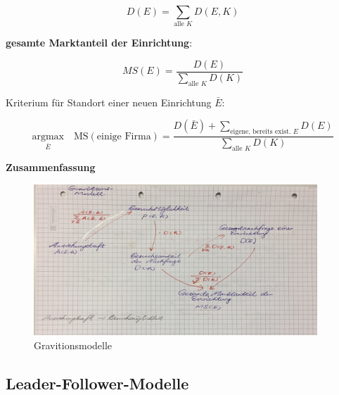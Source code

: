       \begin{equation}
        D(E) = \sum_{\text{alle } K}D(E, K)
      \end{equation}

      \par \textbf{gesamte Marktanteil der Einrichtung}:

      \begin{equation}
        MS(E) = \frac{D(E)}{\sum_{\text{alle } K}D(K)}
      \end{equation}

      \par Kriterium für Standort einer neuen Einrichtung $\bar{E}$:

      \[ \underset{\bar{E}}{\text{argmax}} \quad \text{MS}(\text{einige Firma}) = \frac{D(\bar{E}) + \sum_{\text{eigene, bereits exist. } E}D(E)}{\sum_{\text{alle } K}{D(K)}}\]

      \textbf{Zusammenfassung}

      \begin{figure}[H]
        \centering
        \includegraphics[width=0.95\textwidth]{Images/Gravitionsmodelle.JPG}
        \caption{Gravitionsmodelle}
        \label{fig:Gravitionsmodelle}
      \end{figure}



      \begin{exmp}
         \color{blue}{Aufgabe 4}
       \end{exmp}     

      

    \subsection{Leader-Follower-Modelle} %
    \label{sub:leader_follower_modelle}

